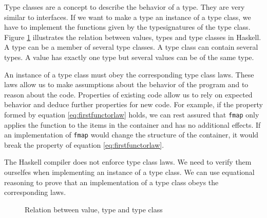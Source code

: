 Type classes are a concept to describe the behavior of a type. 
They are very similar to interfaces. If we want to make a type an instance of a type class, we have to implement the functions given by the \glspl{typesignature} of the type class. Figure \ref{fig:typeclassrelation} illustrates the relation between values, types and type classes in Haskell. A type can be a member of several type classes. A type class can contain several types. A value has exactly one type but several values can be of the same type.

An instance of a type class must obey the corresponding type class laws. These laws allow us to make assumptions about the behavior of the program and to reason about the code. Properties of existing code allow us to rely on expected behavior and deduce further properties for new code. For example, if the property formed by equation \ref{eq:firstfunctorlaw} holds, we can rest assured that \verb|fmap| only applies the function to the items in the container and has no additional effects. If an implementation of \verb|fmap| would change the structure of the container, it would break the property of equation \ref{eq:firstfunctorlaw}.

The Haskell compiler does not enforce type class laws. We need to verify them ourselfes when implementing an instance of a type class. We can use equational reasoning to prove that an implementation of a type class obeys the corresponding laws.


\begin{figure}
\centering
{}
\caption{Relation between value, type and type class}
\label{fig:typeclassrelation}
\end{figure}
